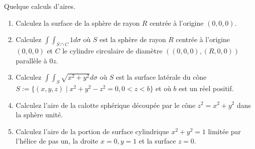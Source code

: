 
\begin{exercice}\label{exoVariete0012}

	Quelque calculs d'aires.
\begin{enumerate}
\item Calculez la surface de la sphère de rayon $R$ centrée à l'origine $(0,0,0)$.

\item Calculez $ \int\! \! \int_{S \cap C}  1 d \sigma $ où $S$ est la sphère de rayon $R$ centrée à l'origine $(0,0,0)$ et $C$ le cylindre circulaire de diamètre $((0,0,0),(R,0,0))$ parallèle à $0z$.

\item Calculez $ \int\! \! \int_{S}  \sqrt{x^2 + y^2} d \sigma $
où $S$ est la surface latérale du cône $S:= \{ (x,y,z) \mid x^2 + y^2 
-z^2 =0, 0<z<b \}$ et où $b$ est un réel positif.

\item Calculez l'aire de la calotte sphérique découpée par le cône $z^2=x^2+y^2$ dans la sphère unité.

\item Calculez l'aire de la portion de surface cylindrique $x^2+y^2=1$ limitée par l'hélice de pas un, la droite $x=0,y=1$ et la surface $z=0$.

\end{enumerate}

\end{exercice}
